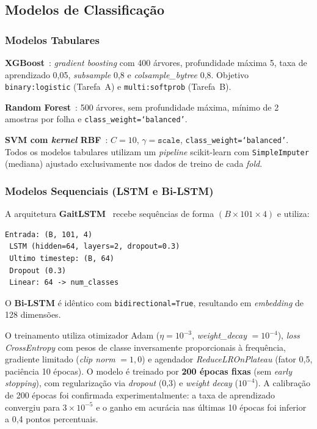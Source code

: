 \documentclass[a4paper,12pt]{article}
\begin{document}
\subsection{Modelos de Classificação}

\subsubsection{Modelos Tabulares}

\textbf{XGBoost}~\cite{Chen2016}: \textit{gradient boosting} com 400 árvores,
profundidade máxima 5, taxa de aprendizado 0,05, \textit{subsample} 0,8 e
\textit{colsample\_bytree} 0,8. Objetivo \texttt{binary:logistic} (Tarefa~A) e
\texttt{multi:softprob} (Tarefa~B).

\textbf{Random Forest}~\cite{Breiman2001}: 500 árvores, sem profundidade máxima,
mínimo de 2 amostras por folha e \texttt{class\_weight=`balanced'}.

\textbf{SVM com \textit{kernel} RBF}~\cite{Cortes1995}: $C = 10$,
$\gamma = \texttt{scale}$, \texttt{class\_weight=`balanced'}. Todos os modelos
tabulares utilizam um \textit{pipeline} scikit-learn com \texttt{SimpleImputer}
(mediana) ajustado exclusivamente nos dados de treino de cada \textit{fold}.

\subsubsection{Modelos Sequenciais (LSTM e Bi-LSTM)}
\label{sec:lstm}

A arquitetura \textbf{GaitLSTM}~\cite{Hochreiter1997} recebe sequências de forma
$(B \times 101 \times 4)$ e utiliza:

\begin{lstlisting}
Entrada: (B, 101, 4)
 LSTM (hidden=64, layers=2, dropout=0.3)
 Ultimo timestep: (B, 64)
 Dropout (0.3)
 Linear: 64 -> num_classes
\end{lstlisting}

O \textbf{Bi-LSTM} é idêntico com \texttt{bidirectional=True}, resultando em
\textit{embedding} de 128 dimensões.

O treinamento utiliza otimizador Adam ($\eta = 10^{-3}$,
\textit{weight\_decay} $= 10^{-4}$), \textit{loss} \textit{CrossEntropy} com
pesos de classe inversamente proporcionais à frequência, gradiente limitado
(\textit{clip norm} $= 1{,}0$) e agendador \textit{ReduceLROnPlateau} (fator 0,5,
paciência 10 épocas). O modelo é treinado por \textbf{200 épocas fixas}
(sem \textit{early stopping}), com regularização via \textit{dropout} (0,3) e
\textit{weight decay} ($10^{-4}$). A calibração de 200 épocas foi confirmada
experimentalmente: a taxa de aprendizado convergiu para $3 \times 10^{-5}$ e o
ganho em acurácia nas últimas 10 épocas foi inferior a 0,4 pontos percentuais.
\end{document}
